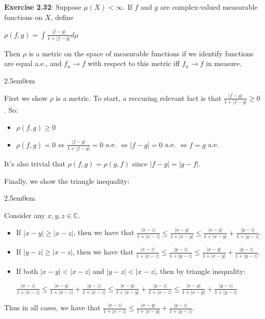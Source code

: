 \documentclass{book}
\newcommand{\exTwoP}{%
   \color{RedViolet}%
   \fontsize{13}{15}\selectfont%
}
\newcommand{\exPPP}{%
   \color{VioletRed}%
   \fontsize{12}{14}\selectfont%
}
\newenvironment{myIndent}{%
   \begin{adjustwidth}{2.5em}{0em}%
}{%
   \end{adjustwidth}%
}
\newcommand{\blab}[1]{\textbf{#1}}
\newcommand{\retTwo}{\hfill\bigbreak}
\begin{document}
\blab{Exercise 2.32}: Suppose $\mu(X) < \infty$. If $f$ and $g$ are complex-valued measurable functions on $X$, define

{\centering $\rho(f, g) = \int\frac{|f - g|}{1 + |f - g|}d\mu$ \retTwo\par}

Then $\rho$ is a metric on the space of measurable functions if we identify functions are equal a.e., and $f_n \rightarrow f$ with respect to this metric iff $f_n \rightarrow f$ in measure.

\begin{myIndent}\exTwoP
	First we show $\rho$ is a metric. To start, a reccuring relevant fact is that $\frac{|f - g|}{1 + |f - g|} \geq 0$. So:
	
	\begin{itemize}
		\item $\rho(f, g) \geq 0$
		\item $\rho(f, g) = 0 \Longleftrightarrow \frac{|f-g|}{1 + |f-g|} = 0$ a.e. $\Longleftrightarrow |f - g| = 0$ a.e. $\Longleftrightarrow f = g$ a.e.\retTwo
	\end{itemize}

	It's also trivial that $\rho(f, g) = \rho(g, f)$ since $|f - g| = |g - f|$.\retTwo

	Finally, we show the triangle inequality:
	\begin{myIndent}\exPPP
		Consider any $x, y, z \in \mathbb{C}$. 
		\begin{itemize}
			\item If $|x - y| \geq |x - z|$, then we have that $\frac{|x - z|}{1 + |x - z|} \leq \frac{|x - y|}{1 + |x - y|} \leq \frac{|x - y|}{1 + |x - y|} + \frac{|y - z|}{1 + |y - z|}$.
			\item If $|y - z| \geq |x - z|$, then we have that $\frac{|x - z|}{1 + |x - z|} \leq \frac{|y - z|}{1 + |y - z|} \leq \frac{|x - y|}{1 + |x - y|} + \frac{|y - z|}{1 + |y - z|}$.
			\item If both $|x - y| < |x - z|$ and $|y - z| < |x - z|$, then by triangle inequality:
			
			{\centering $\frac{|x - z|}{1 + |x - z|} \leq \frac{|x - y|}{1 + |x - z|} + \frac{|y - z|}{1 + |x - z|} \leq \frac{|x - y|}{1 + |x - y|} + \frac{|y - z|}{1 + |x - z|} \leq \frac{|x - y|}{1 + |x - y|} + \frac{|y - z|}{1 + |y - z|}$ \retTwo\par}
		\end{itemize}

		Thus in all cases, we have that $\frac{|x - z|}{1 + |x - z|} \leq \frac{|x - y|}{1 + |x - y|} + \frac{|y - z|}{1 + |y - z|}$.\retTwo


\end{myIndent}
\end{myIndent}
\end{document}
